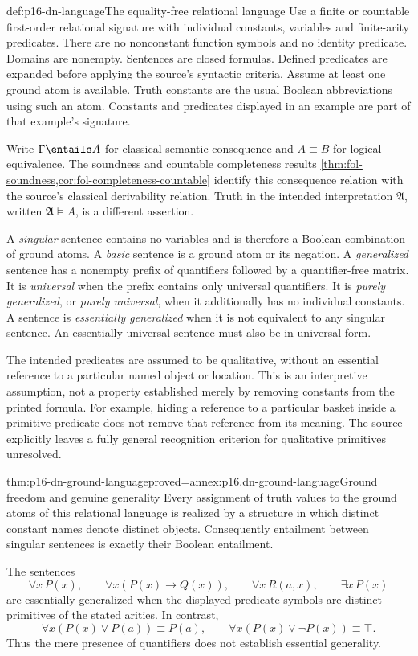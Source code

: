 \begin{hbdefinition}{def:p16-dn-language}{The equality-free relational language}
Use a finite or countable first-order relational signature
with individual constants, variables and finite-arity
predicates. There are no nonconstant function symbols
and no identity predicate. Domains are nonempty.
Sentences are closed formulas. Defined predicates are
expanded before applying the source's syntactic criteria.
Assume at least one ground atom is available.
Truth constants are the usual Boolean abbreviations
using such an atom. Constants and predicates displayed
in an example are part of that example's signature.

Write \(\Gamma\entails A\) for classical semantic
consequence and \(A\equiv B\) for logical equivalence.
The soundness and countable completeness results
\cref{thm:fol-soundness,cor:fol-completeness-countable}
identify this consequence relation with the source's
classical derivability relation. Truth in the intended
interpretation \(\mathfrak A\), written
\(\mathfrak A\models A\), is a different assertion.

A \emph{singular} sentence contains no variables and
is therefore a Boolean combination of ground atoms.
A \emph{basic} sentence is a ground atom or its negation.
A \emph{generalized} sentence has a nonempty prefix
of quantifiers followed by a quantifier-free matrix.
It is \emph{universal} when the prefix contains only
universal quantifiers. It is \emph{purely generalized},
or \emph{purely universal}, when it additionally has
no individual constants.
A sentence is \emph{essentially generalized} when
it is not equivalent to any singular sentence.
An essentially universal sentence must also be in
universal form.
\end{hbdefinition}

The intended predicates are assumed to be qualitative,
without an essential reference to a particular named
object or location. This is an interpretive assumption,
not a property established merely by removing constants
from the printed formula. For example, hiding a reference
to a particular basket inside a primitive predicate
does not remove that reference from its meaning.
The source explicitly leaves a fully general recognition
criterion for qualitative primitives unresolved.

\begin{hblemma}{thm:p16-dn-ground-language}{proved=annex:p16.dn-ground-language}{Ground freedom and genuine generality}
Every assignment of truth values to the ground atoms
of this relational language is realized by a structure
in which distinct constant names denote distinct objects.
Consequently entailment between singular sentences
is exactly their Boolean entailment.

The sentences
\[
 \forall x\,P(x),\qquad
 \forall x(P(x)\to Q(x)),\qquad
 \forall x\,R(a,x),\qquad
 \exists x\,P(x)
\]
are essentially generalized when the displayed predicate
symbols are distinct primitives of the stated arities.
In contrast,
\[
 \forall x(P(x)\lor P(a))\equiv P(a),\qquad
 \forall x(P(x)\lor\neg P(x))\equiv\top .
\]
Thus the mere presence of quantifiers does not establish
essential generality.
\end{hblemma}

